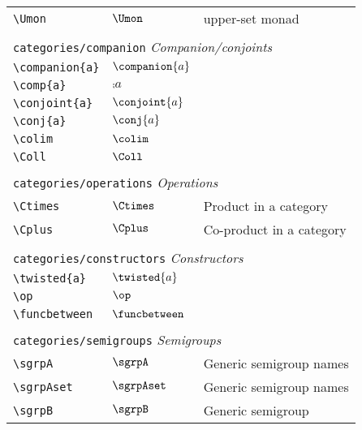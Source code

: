 \begin{longtable}{lll}
 {\color[rgb]{0.5,0.5,0.5}\texttt{\textbackslash Umon}} & $\Umon$ &  upper-set monad\\ 
  &  & \\ 
 \multicolumn{3}{l}{{\color[rgb]{0.5,0.5,0.5}\texttt{categories/companion}} \emph{Companion/conjoints}}\\ 
 \hline
{\color[rgb]{0.5,0.5,0.5}\texttt{\textbackslash companion\{a\}}} & $\companion{a}$ & \\ 
 {\color[rgb]{0.5,0.5,0.5}\texttt{\textbackslash comp\{a\}}} & $\comp{a}$ & \\ 
 {\color[rgb]{0.5,0.5,0.5}\texttt{\textbackslash conjoint\{a\}}} & $\conjoint{a}$ & \\ 
 {\color[rgb]{0.5,0.5,0.5}\texttt{\textbackslash conj\{a\}}} & $\conj{a}$ & \\ 
 {\color[rgb]{0.5,0.5,0.5}\texttt{\textbackslash colim}} & $\colim$ & \\ 
 {\color[rgb]{0.5,0.5,0.5}\texttt{\textbackslash Coll}} & $\Coll$ & \\ 
  &  & \\ 
 \multicolumn{3}{l}{{\color[rgb]{0.5,0.5,0.5}\texttt{categories/operations}} \emph{Operations}}\\ 
 \hline
{\color[rgb]{0.5,0.5,0.5}\texttt{\textbackslash Ctimes}} & $\Ctimes$ &  Product in a category\\ 
 {\color[rgb]{0.5,0.5,0.5}\texttt{\textbackslash Cplus}} & $\Cplus$ &  Co-product in a category\\ 
  &  & \\ 
 \multicolumn{3}{l}{{\color[rgb]{0.5,0.5,0.5}\texttt{categories/constructors}} \emph{Constructors}}\\ 
 \hline
{\color[rgb]{0.5,0.5,0.5}\texttt{\textbackslash twisted\{a\}}} & $\twisted{a}$ & \\ 
 {\color[rgb]{0.5,0.5,0.5}\texttt{\textbackslash op}} & $\op$ & \\ 
 {\color[rgb]{0.5,0.5,0.5}\texttt{\textbackslash funcbetween}} & $\funcbetween$ & \\ 
  &  & \\ 
 \multicolumn{3}{l}{{\color[rgb]{0.5,0.5,0.5}\texttt{categories/semigroups}} \emph{Semigroups}}\\ 
 \hline
{\color[rgb]{0.5,0.5,0.5}\texttt{\textbackslash sgrpA}} & $\sgrpA$ &  Generic semigroup names\\ 
 {\color[rgb]{0.5,0.5,0.5}\texttt{\textbackslash sgrpAset}} & $\sgrpAset$ &  Generic semigroup names\\ 
 {\color[rgb]{0.5,0.5,0.5}\texttt{\textbackslash sgrpB}} & $\sgrpB$ &  Generic semigroup\\ 

\end{longtable}
